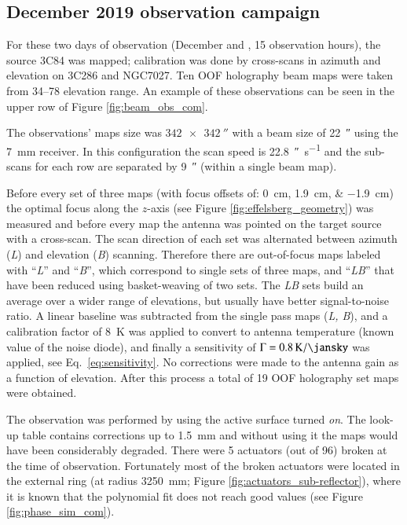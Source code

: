 \documentclass[
    ]
    {aa}
\begin{document}
    \subsection{December 2019 observation campaign} \label{sec:ObsDec2019}

    For these two days of observation (December  and , \num{15} observation hours), the source 3C84 was mapped; calibration was done by cross-scans in azimuth and elevation on 3C286 and NGC7027. Ten OOF holography beam maps were taken from \SIrange{34}{78}{\deg} elevation range. An example of these observations can be seen in the upper row of Figure \ref{fig:beam_obs_com}.

    The observations' maps size was $\SI{342 x 342}{\arcsecond}$ with a beam size of \SI{22}{\arcsecond} using the \SI{7}{\mm} receiver. In this configuration the scan speed is \SI{22.8}{\arcsecond\per\second} and the sub-scans for each row are  separated by \SI{9}{\arcsecond} (within a single beam map).

    Before every set of three maps (with focus offsets of: \SIlist{0;+1.9;-1.9}{\cm}) the optimal focus along the $z$-axis (see Figure \ref{fig:effelsberg_geometry}) was measured and before every map the antenna was pointed on the target source with a cross-scan. The scan direction of each set was alternated between azimuth (\textit{L}) and elevation (\textit{B}) scanning. Therefore there are out-of-focus maps labeled with ``\textit{L}'' and ``\textit{B}'', which correspond to single sets of three maps, and ``\textit{LB}'' that have been reduced using basket-weaving of two sets. The \textit{LB} sets build an average over a wider range of elevations, but usually have better signal-to-noise ratio. A linear baseline was subtracted from the single pass maps (\textit{L, B}), and a calibration factor of \SI{8}{\K} was applied to convert to antenna temperature (known value of the noise diode), and finally a sensitivity of $\Gamma = \SI{0.8}{\K\per\jansky}$ was applied, see Eq.~\eqref{eq:sensitivity}. No corrections were made to the antenna gain as a function of elevation. After this process a total of 19 OOF holography set maps were obtained.

    The observation was performed by using the active surface turned \textit{on}. The look-up table contains corrections up to \SI{1.5}{\mm} and without using it the maps would have been considerably degraded.
    There were \num{5} actuators (out of \num{96}) broken at the time of observation. Fortunately most of the broken actuators were located in the external ring (at radius \SI{3250}{\mm}; Figure \ref{fig:actuators_sub-reflector}), where it is known that the polynomial fit does not reach good values (see Figure \ref{fig:phase_sim_com}).
\end{document}
